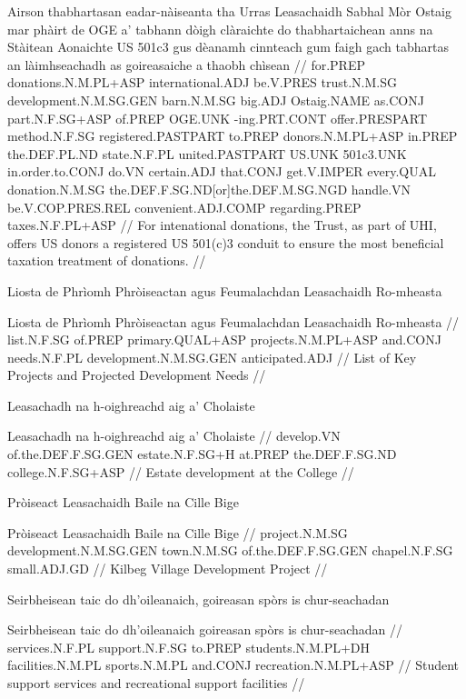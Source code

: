 \documentclass[a4paper,10pt]{article}
\begin{document}
\vspace{4mm}
\gla Airson thabhartasan eadar-nàiseanta tha Urras Leasachaidh Sabhal Mòr Ostaig mar phàirt de OGE a' tabhann dòigh clàraichte do thabhartaichean anns na Stàitean Aonaichte US 501c3 gus dèanamh cinnteach gum faigh gach tabhartas an làimhseachadh as goireasaiche {a thaobh} chìsean  //
\glb for.PREP donations.N.M.PL+ASP international.ADJ be.V.PRES trust.N.M.SG development.N.M.SG.GEN barn.N.M.SG big.ADJ Ostaig.NAME as.CONJ part.N.F.SG+ASP of.PREP OGE.UNK -ing.PRT.CONT offer.PRESPART method.N.F.SG registered.PASTPART to.PREP donors.N.M.PL+ASP in.PREP the.DEF.PL.ND state.N.F.PL united.PASTPART US.UNK 501c3.UNK in.order.to.CONJ do.VN certain.ADJ that.CONJ get.V.IMPER every.QUAL donation.N.M.SG the.DEF.F.SG.ND[or]the.DEF.M.SG.NGD handle.VN be.V.COP.PRES.REL convenient.ADJ.COMP regarding.PREP taxes.N.F.PL+ASP  //
\glft For intenational donations, the Trust, as part of UHI, offers US donors a registered US 501(c)3 conduit to ensure the most beneficial taxation treatment of donations. //
\endgl
\xe

\ex
\begingl
\glpre Liosta de Phrìomh Phròiseactan agus Feumalachdan Leasachaidh Ro-mheasta 

\vspace{4mm}
\gla Liosta de Phrìomh Phròiseactan agus Feumalachdan Leasachaidh Ro-mheasta  //
\glb list.N.F.SG of.PREP primary.QUAL+ASP projects.N.M.PL+ASP and.CONJ needs.N.F.PL development.N.M.SG.GEN anticipated.ADJ  //
\glft List of Key Projects and Projected Development Needs //
\endgl
\xe

\ex
\begingl
\glpre Leasachadh na h-oighreachd aig a' Cholaiste 

\vspace{4mm}
\gla Leasachadh na h-oighreachd aig a' Cholaiste  //
\glb develop.VN of.the.DEF.F.SG.GEN estate.N.F.SG+H at.PREP the.DEF.F.SG.ND college.N.F.SG+ASP  //
\glft Estate development at the College //
\endgl
\xe

\ex
\begingl
\glpre Pròiseact Leasachaidh Baile na Cille Bige 

\vspace{4mm}
\gla Pròiseact Leasachaidh Baile na Cille Bige  //
\glb project.N.M.SG development.N.M.SG.GEN town.N.M.SG of.the.DEF.F.SG.GEN chapel.N.F.SG small.ADJ.GD  //
\glft Kilbeg Village Development Project //
\endgl
\xe

\ex
\begingl
\glpre Seirbheisean taic do dh'oileanaich, goireasan spòrs is chur-seachadan 

\vspace{4mm}
\gla Seirbheisean taic do dh'oileanaich goireasan spòrs is chur-seachadan  //
\glb services.N.F.PL support.N.F.SG to.PREP students.N.M.PL+DH facilities.N.M.PL sports.N.M.PL and.CONJ recreation.N.M.PL+ASP  //
\glft Student support services and recreational support facilities //
\endgl
\xe
\end{document}
